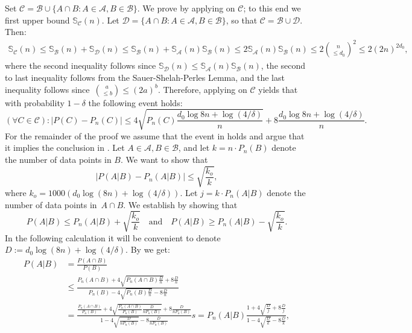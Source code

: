\documentclass{article}
\def\B{{\mathcal B}}
\newcommand{\cA}{\mathcal{A}}
\newcommand{\cB}{\mathcal{B}}
\newcommand{\cC}{\mathcal{C}}
\begin{document}
Set $\cC = \cB\cup \{A\cap B : A\in\cA, B\in\B\}$. 
We prove  by applying  on $\cC$;
to this end we first upper bound $\mathbb{S}_\cC(n)$.
Let $\mathcal{D}= \{A\cap B :A\in\cA, B\in\cB\}$, so that $\cC = \cB \cup \mathcal{D}$. Then:
\begin{align*}
\mathbb{S}_\cC(n) 
\leq \mathbb{S}_\cB(n) + \mathbb{S}_{\mathcal{D}}(n) \leq \mathbb{S}_\cB(n)  +  \mathbb{S}_\cA(n)\mathbb{S}_\cB(n)\leq 2\mathbb{S}_\cA(n)\mathbb{S}_\cB(n)\leq 2{n \choose \leq d_0}^2\leq 2 (2n)^{2d_0},
\end{align*}
where the second inequality follows since $\mathbb{S}_{\mathcal{D}}(n) \leq \mathbb{S}_\cA(n)\mathbb{S}_\cB(n)$,
the second to last inequality follows from the Sauer-Shelah-Perles Lemma, and the last inequality
follows since~${a \choose \leq b} \leq (2a)^b$.
Therefore, applying  on $\cC$ yields that with probability $1-\delta$ the following event holds:
\begin{equation}\label{eq:BBL}
(\forall C\in \cC): \lvert P(C)- P_n(C) \rvert \leq  4\sqrt{P_n(C)\frac{d_0\log 8n + \log(4/\delta)}{n}} + 8\frac{d_0\log 8n + \log(4/\delta)}{n}. 
\end{equation}
For the remainder of the proof we assume that the event in  holds and argue that it implies
the conclusion in .
Let $A\in\cA, B\in\cB$,  
and let $k=n\cdot P_n(B)$ denote the number of data points in $B$. 
We want to show that
\begin{equation}\label{eq:qed}
\left\lvert P(A \vert B) - P_n(A \vert B) \right\rvert \leq 
\sqrt{\frac{k_o}{k}},
\end{equation}
where $k_o=1000 \left(d_0 \log(8n) + \log(4/\delta)\right)$.
Let $j=k\cdot P_n(A\vert B)$ denote the number of data points in~$A\cap B$.
We establish  by showing that 
\[P(A \vert B) \leq  P_n(A\vert B)  + \sqrt{\frac{k_o}{k}}
~~~\text{ and }~~~ P(A \vert B) \geq  P_n(A\vert B)  - \sqrt{\frac{k_o}{k}}.
\]
In the following calculation it will be convenient to denote $D:=d_0 \log(8n) + \log(4/\delta)$. 
By  we get:
\begin{align*}
P(A \vert B) &= \frac{P(A\cap B)}{P(B)}\\
			 &\leq \frac{P_n(A\cap B) + 4\sqrt{P_n(A\cap B)\frac{D}{n}} + 8\frac{D}{n}}{P_n(B) - 4\sqrt{P_n(B)\frac{D}{n}} - 8\frac{D}{n}}\\
			 &=\frac{\frac{P_n(A\cap B)}{P_n(B)} + 4\sqrt{\frac{P_n(A\cap B)}{P_n(B)}\frac{D}{nP_n(B)}} + 8\frac{D}{nP_n(B)}}{1 - 4\sqrt{\frac{D}{nP_n(B)}} - 8\frac{D}{nP_n(B)}}s
			 =P_n(A \vert B)\frac{1+ 4\sqrt{\frac{D}{j}} + 8\frac{D}{j}}{1 - 4\sqrt{\frac{D}{k}} - 8\frac{D}{k}},
\end{align*}
\end{document}
